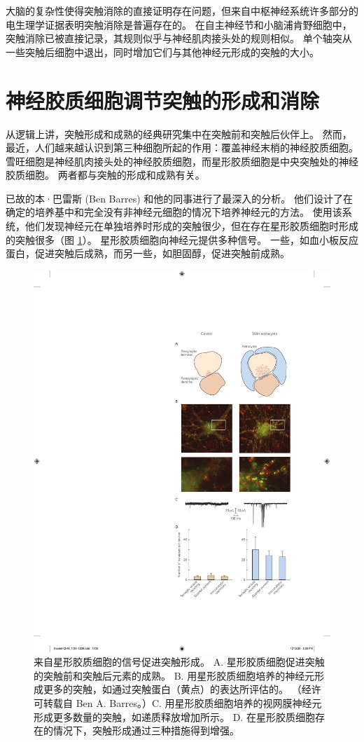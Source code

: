 大脑的复杂性使得突触消除的直接证明存在问题，但来自中枢神经系统许多部分的电生理学证据表明突触消除是普遍存在的。 在自主神经节和小脑浦肯野细胞中，突触消除已被直接记录，其规则似乎与神经肌肉接头处的规则相似。 单个轴突从一些突触后细胞中退出，同时增加它们与其他神经元形成的突触的大小。

\section{神经胶质细胞调节突触的形成和消除}
从逻辑上讲，突触形成和成熟的经典研究集中在突触前和突触后伙伴上。 然而，最近，人们越来越认识到第三种细胞所起的作用：覆盖神经末梢的神经胶质细胞。 雪旺细胞是神经肌肉接头处的神经胶质细胞，而星形胶质细胞是中央突触处的神经胶质细胞。 两者都与突触的形成和成熟有关。

已故的本·巴雷斯 (Ben Barres) 和他的同事进行了最深入的分析。 他们设计了在确定的培养基中和完全没有非神经元细胞的情况下培养神经元的方法。 
使用该系统，他们发现神经元在单独培养时形成的突触很少，但在存在星形胶质细胞时形成的突触很多（图 \ref{fig:48_20}）。 
星形胶质细胞向神经元提供多种信号。 一些，如血小板反应蛋白，促进突触后成熟，而另一些，如胆固醇，促进突触前成熟。

\begin{figure}[htbp]
	\centering
	\includegraphics[width=0.5\linewidth]{chap48/fig_48_20}
	\caption{来自星形胶质细胞的信号促进突触形成。 A. 星形胶质细胞促进突触的突触前和突触后元素的成熟。 B. 用星形胶质细胞培养的神经元形成更多的突触，如通过突触蛋白（黄点）的表达所评估的。 （经许可转载自 Ben A. Barres。）C. 用星形胶质细胞培养的视网膜神经元形成更多数量的突触，如递质释放增加所示。 D. 在星形胶质细胞存在的情况下，突触形成通过三种措施得到增强。}
	\label{fig:48_20}
\end{figure}

